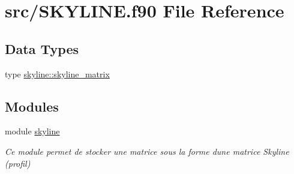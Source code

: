 \hypertarget{_s_k_y_l_i_n_e_8f90}{}\section{src/\+S\+K\+Y\+L\+I\+NE.f90 File Reference}
\label{_s_k_y_l_i_n_e_8f90}
\subsection*{Data Types}
\begin{DoxyCompactItemize}
\item 
type \hyperlink{structskyline_1_1skyline__matrix}{skyline\+::skyline\+\_\+matrix}
\end{DoxyCompactItemize}
\subsection*{Modules}
\begin{DoxyCompactItemize}
\item 
module \hyperlink{namespaceskyline}{skyline}
\begin{DoxyCompactList}\small\item\em Ce module permet de stocker une matrice sous la forme d\textquotesingle{}une matrice Skyline (profil) \end{DoxyCompactList}\end{DoxyCompactItemize}
